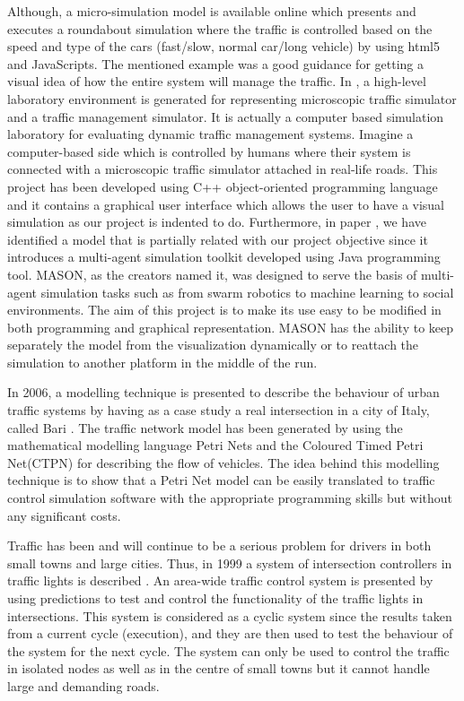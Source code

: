 \documentclass[oneside]{article}
\begin{document}
\noindent Although, a micro-simulation model is available online which presents and executes a roundabout simulation where the traffic is controlled based on the speed and type of the cars (fast/slow, normal car/long vehicle) by using html5 and JavaScripts\cite{traffichtml5}. The mentioned example was a good guidance for getting a visual idea of how the entire system will manage the traffic. In \cite{yang2000simulation}, a high-level laboratory environment is generated for representing microscopic traffic simulator and a traffic management simulator. It is actually a computer based simulation laboratory for evaluating dynamic traffic management systems. Imagine a computer-based side which is controlled by humans where their system is connected with a microscopic traffic simulator attached in real-life roads. This project has been developed using C++ object-oriented programming language and it contains a graphical user interface which allows the user to have a visual simulation as our project is indented to do. Furthermore, in paper \cite{luke2005mason}, we have identified a model that is partially related with our project objective since it introduces a multi-agent simulation toolkit developed using Java programming tool. MASON, as the creators named it, was designed to serve the basis of multi-agent simulation tasks such as from swarm robotics to machine learning to social environments. The aim of this project is to make its use easy to be modified in both programming and graphical representation. MASON has the ability to keep separately the model from the visualization dynamically or to reattach the simulation to another platform in the middle of the run. 
\newline

\noindent In 2006, a modelling technique is presented to describe the behaviour of urban traffic systems by having as a case study a real intersection in a city of Italy, called Bari \cite{dotoli2006urban}. The traffic network model has been generated by using the mathematical modelling language Petri Nets and the Coloured Timed Petri Net(CTPN) for describing the flow of vehicles. The idea behind this modelling technique is to show that a Petri Net model can be easily translated to traffic control simulation software with the appropriate programming skills but without any significant costs.
\newline

\noindent Traffic has been and will continue to be a serious problem for drivers in both small towns and large cities. Thus, in 1999 a system of intersection controllers in traffic lights is described \cite{tavladakis1999development}. An area-wide traffic control system is presented by using predictions to test and control the functionality of the traffic lights in intersections. This system is considered as a cyclic system since the results taken from a current cycle (execution), and they are then used to test the behaviour of the system for the next cycle. The system can only be used to control the traffic in isolated nodes as well as in the centre of small towns but it cannot handle large and demanding roads. 
\newline
\end{document}
